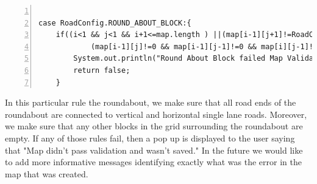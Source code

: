\documentclass[oneside]{article}
\begin{document}
\lstset{language=Java, framexleftmargin=10pt, framexrightmargin=10pt, frame=single, breaklines=true, }          %
\begin{lstlisting}[numbers=left, numberstyle=\small, numbersep=8pt,  framexleftmargin=1pt, framexrightmargin=10pt ] 

case RoadConfig.ROUND_ABOUT_BLOCK:{
	if((i<1 && j<1 && i+1<=map.length ) ||(map[i-1][j+1]!=RoadConfig.HORIZONTAL_BLOCK && map[i-1][j+1]!=RoadConfig.HORIZONTAL_ENTER_BLOCK) || (map[i+3][j+1]!=RoadConfig.HORIZONTAL_BLOCK && map[i+3][j+1]!=RoadConfig.HORIZONTAL_EXIT_BLOCK) || (map[i+1][j-1]!=RoadConfig.VERTICAL_BLOCK && map[i+1][j-1]!=RoadConfig.VERTICAL_ENTER_BLOCK) || (map[i+1][j+3]!=RoadConfig.VERTICAL_BLOCK && map[i+1][j+3]!=RoadConfig.VERTICAL_EXIT_BLOCK) || 
			(map[i-1][j]!=0 && map[i-1][j-1]!=0 && map[i][j-1]!=0 && map[i+3][j]!=0 && map[i+3][j-1]!=0 && map[i+2][j-1]!=0 && map[i+3][j+2]!=0 && map[i+3][j+3]!=0 && map[i+2][j+3]!=0 && map[i][j+3]!=0 && map[i-1][j+3]!=0 && map[i-1][j+2]!=0)){
		System.out.println("Round About Block failed Map Validations");
		return false;
	}
\end{lstlisting}

\noindent In this particular rule the roundabout, we make sure that all road ends of the roundabout are connected to vertical and horizontal single lane roads. Moreover, we make sure that any other blocks in the grid surrounding the roundabout are empty. If any of those rules fail, then a pop up is displayed to the user saying that "Map didn't pass validation and wasn't saved." In the future we would like to add more informative messages identifying exactly what was the error in the map that was created. 
\end{document}
